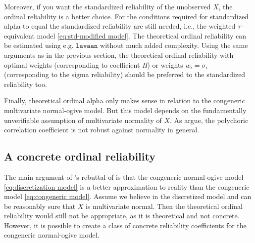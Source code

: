 \documentclass[twoside]{article}
\begin{document}
Moreover, if you want the standardized reliability of the unobserved $X$, the ordinal reliability is a better choice. For the conditions required for standardized alpha to equal the standardized reliability are still needed, i.e., the weighted $\tau$-equivalent model \eqref{eq:std-modified model}. The theoretical ordinal reliability can be estimated using e.g. $\mathtt{lavaan}$ without much added complexity. Using the same arguments as in the previous section, the theoretical ordinal reliability with optimal weights (corresponding to coefficient \textit{H}) or weights $w_{i}=\sigma_{i}$ (corresponding to the sigma reliability) should be preferred to the standardized reliability too.

Finally, theoretical ordinal alpha only makes sense in relation to the congeneric multivariate normal-ogive model. But this model depends on the fundamentally unverifiable assumption of multivariate normality of $X$. As \citet{Foldnes2019-yd} argue, the polychoric correlation coefficient is not robust against normality in general.

\subsection{A concrete ordinal reliability}

The main argument of \citet{Zumbo2019-lm}'s rebuttal of \citet{Chalmers2018-fj} is that the congeneric normal-ogive model \eqref{eq:discretization model}  is a better approximation to reality than the congeneric model \eqref{eq:congeneric model}. Assume we believe in the discretized model and can be reasonably sure that $X$ is multivariate normal. Then the theoretical ordinal reliability would still not be appropriate, as it is theoretical and not concrete. However, it is possible to create a class of concrete reliability coefficients for the congeneric normal-ogive model.
\end{document}
